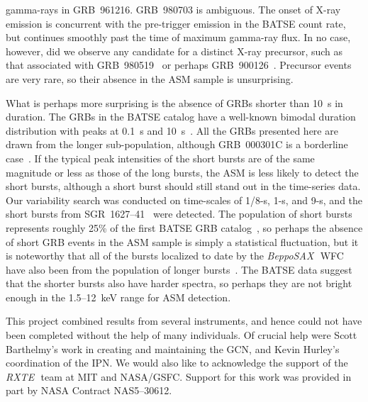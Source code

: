 \documentclass{aastex}
\def\sax{{\it BeppoSAX\,}}
\def\rxte{{\it RXTE\,}}
\begin{document}
\begin{multicols}{2}

\noindent
gamma-rays in GRB~961216.  GRB~980703 is ambiguous.  The onset of
X-ray emission is concurrent with the pre-trigger emission in the
BATSE count rate, but continues smoothly past the time of maximum
gamma-ray flux.  In no case, however, did we observe any candidate for
a distinct X-ray precursor, such as that associated with
GRB~980519~\citep{zhpf99} or perhaps GRB~900126~\citep{minpf91}.
Precursor events are very rare, so their absence in the ASM sample is
unsurprising.

What is perhaps more surprising is the absence of GRBs shorter than
10~s in duration.  The GRBs in the BATSE catalog have a well-known
bimodal duration distribution with peaks at 0.1~s and
10~s~\citep{kmfbb93,fmwbh94,kpkpp96}.  All the GRBs presented here are
drawn from the longer sub-population, although GRB~000301C is a
borderline case~\citep{jfghh00}.  If the typical peak intensities of
the short bursts are of the same magnitude or less as those of the
long bursts, the ASM is less likely to detect the short bursts,
although a short burst should still stand out in the time-series data.
Our variability search was conducted on time-scales of 1/8-s, 1-s, and
9-s, and the short bursts from SGR~1627--41~\citep{sbl99} were
detected.  The population of short bursts represents roughly 25\% of
the first BATSE GRB catalog~\citep{kmfbb93}, so perhaps the absence of
short GRB events in the ASM sample is simply a statistical
fluctuation, but it is noteworthy that all of the bursts localized to
date by the \sax~WFC have also been from the population of longer
bursts~\citep{gsccd00,facmp00}.  The BATSE data suggest that the
shorter bursts also have harder spectra, so perhaps they are not
bright enough in the 1.5--12~keV range for ASM detection.

\acknowledgements

This project combined results from several instruments, and hence
could not have been completed without the help of many individuals.
Of crucial help were Scott Barthelmy's work in creating and
maintaining the GCN, and Kevin Hurley's coordination of the IPN.  We
would also like to acknowledge the support of the \rxte~team at MIT
and NASA/GSFC.  Support for this work was provided in part by NASA
Contract NAS5--30612.

\newcommand{\noopsort}[1]{} \newcommand{\printfirst}[2]{#1}
  \newcommand{\singleletter}[1]{#1} \newcommand{\switchargs}[2]{#2#1}
\begin{thebibliography}{}


\end{thebibliography}
\end{multicols}
\end{document}
